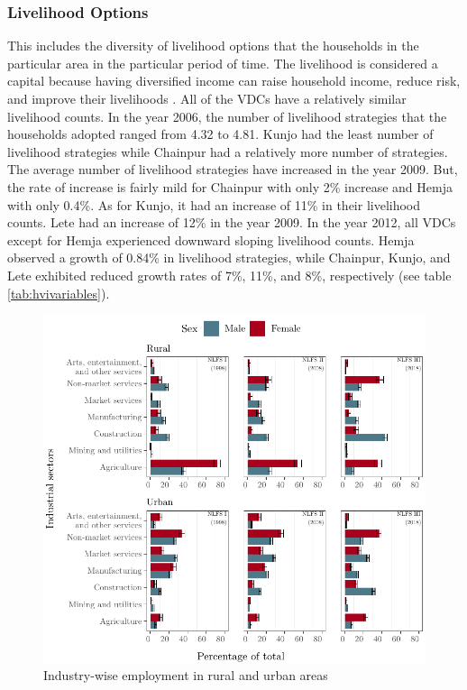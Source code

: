 \subsubsection{Livelihood Options}
This includes the diversity of livelihood options that the households in the particular area in the particular period of time. The livelihood is considered a capital because having diversified income can raise household income, reduce risk, and improve their livelihoods \citep{scoones2013livelihoods}. All of the VDCs have a relatively similar livelihood counts. In the year 2006, the number of livelihood strategies that the households adopted ranged from 4.32 to 4.81. Kunjo had the least number of livelihood strategies while Chainpur had a relatively more number of strategies. The average number of livelihood strategies have increased in the year 2009. But, the rate of increase is fairly mild for Chainpur with only 2\% increase and Hemja with only 0.4\%.  As for Kunjo, it had an increase of 11\% in their livelihood counts. Lete had an increase of 12\% in the year 2009. In the year 2012, all VDCs except for Hemja experienced downward sloping livelihood counts. Hemja observed a growth of 0.84\% in livelihood strategies, while Chainpur, Kunjo, and Lete exhibited reduced growth rates of 7\%, 11\%, and 8\%, respectively (see table \ref{tab:hvivariables}).

\begin{figure}[htb!]
	\centering
	\includegraphics{./figure/industryUrbRur_bar_all_all}
	\caption{Industry-wise employment in rural and urban areas}
	\label{fig:industryUrbRur}
\end{figure}


